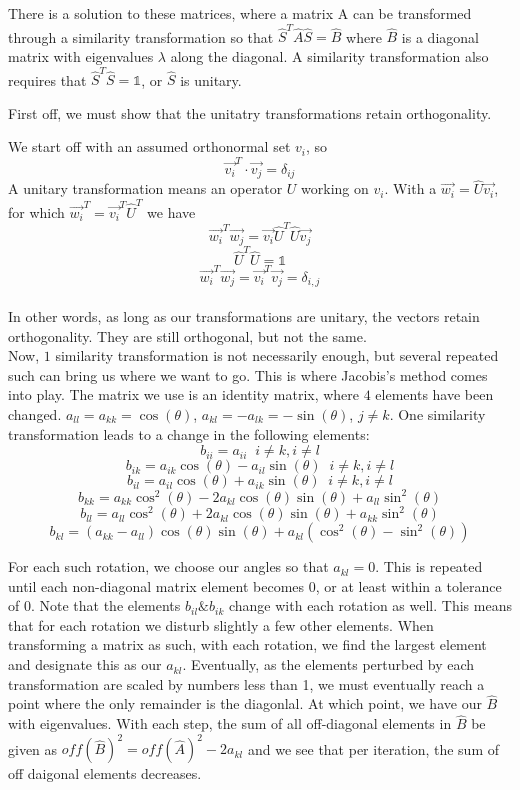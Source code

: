 \documentclass[10pt, twocolumn]{article}
\begin{document}
There is a solution to these matrices, where a matrix A can be transformed through a similarity 
transformation so that $\hat{S}^T \hat{A} \hat{S} = \hat{B}$ where $\hat{B}$ is a diagonal matrix 
with eigenvalues $\lambda$ along the diagonal. A similarity transformation also requires that 
$\hat{S}^T\hat{S} = \mathds{1}$, or $\hat{S}$ is unitary. 

First off, we must show that the unitatry transformations retain orthogonality. 

We start off with an assumed orthonormal set $v_i$, so
\[
\vec{v_i}^T \cdot \vec{v_j} = \delta_{ij}
\]
A unitary transformation means an operator $U$ working on $v_i$.
With a $\vec{w_{i}} = \hat{U}\vec{v_{i}}$, for which 
$\vec{w_{i}}^T = \vec{v_{i}}^T\hat{U}^T$ we have 
\[
    \vec{w_{i}}^T\vec{w_{j}} = \vec{v_i} \hat{U}^T \hat{U} \vec{v_j} 
\]
\[
    \hat{U}^T \hat{U} = \mathds{1} 
\]
\[
    \vec{w_i}^T\vec{w_j} = \vec{v_i}^T\vec{v_j} = \delta_{i,j}
\]\\

In other words, as long as our transformations are unitary, the vectors retain 
orthogonality. They are still orthogonal, but not the same. \\

Now, $1$ similarity transformation is not necessarily enough, but several repeated such can 
bring us where we want to go. This is where Jacobis's method comes into play. The matrix we use is
an identity matrix, where $4$ elements have been changed. $a_{ll} = a_{kk} = \cos(\theta)$, 
$a_{kl} = -a_{lk} = -\sin(\theta)$, $j \neq k$. One similarity transformation leads to a change in 
the following elements: 
\[ b_{ii} = a_{ii} \; \; i \neq k, i \neq l \]
\[ b_{ik} = a_{ik}\cos(\theta) - a_{il}\sin(\theta) \; \; i \neq k, i \neq l \]
\[ b_{il} = a_{il}\cos(\theta) + a_{ik}\sin(\theta) \; \; i \neq k, i \neq l \]
\[ b_{kk} = a_{kk}\cos^2(\theta) - 2a_{kl}\cos(\theta)\sin(\theta) + a_{ll}\sin^2(\theta) \]
\[ b_{ll} = a_{ll}\cos^2(\theta) + 2a_{kl}\cos(\theta)\sin(\theta) + a_{kk}\sin^2(\theta) \]
\[ b_{kl} = (a_{kk} - a_{ll})\cos(\theta)\sin(\theta) + a_{kl}(\cos^2(\theta) - \sin^2(\theta)) \]

For each such rotation, we choose our angles so that $a_{kl} = 0$. This is repeated until each non-diagonal
matrix element becomes 0, or at least within a tolerance of 0. Note that the elements $b_{il} \& b_{ik}$
change with each rotation as well. This means that for each rotation we disturb slightly a few other 
elements. When transforming a matrix as such, with each rotation, we find the largest element and designate
this as our $a_{kl}$. Eventually, as the elements perturbed by each transformation are scaled by numbers less
than 1, we must eventually reach a point where the only remainder is the diagonlal. At which point, we have
our $\hat{B}$ with eigenvalues. With each step, the sum of all off-diagonal elements in $\hat{B}$ be given 
as $off(\hat{B})^2 = off(\hat{A})^2 - 2a_{kl}$ and we see that per iteration, the sum of off daigonal elements 
decreases. 
\end{document}
